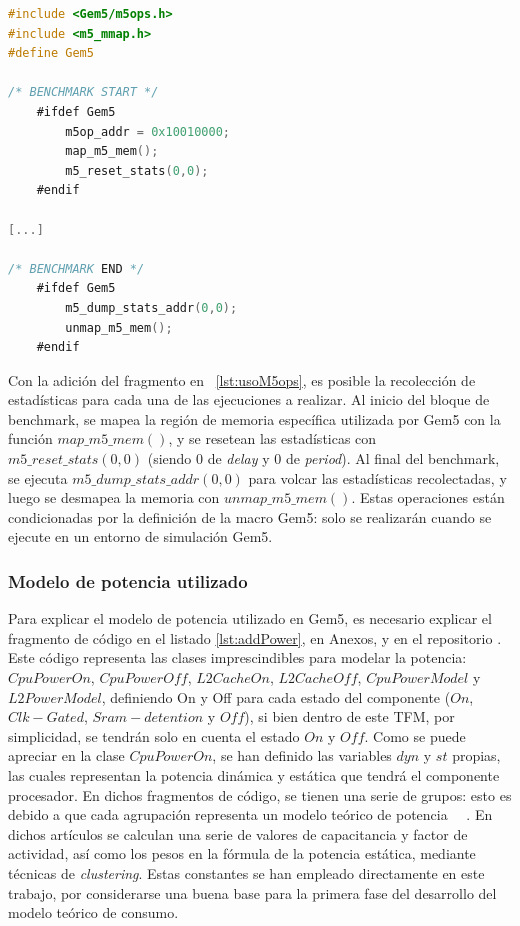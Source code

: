 \begin{lstlisting}[language=C,showstringspaces=false,frame=single,caption={Fragmento añadido},label=lst:usoM5ops]
#include <Gem5/m5ops.h>
#include <m5_mmap.h>
#define Gem5

/* BENCHMARK START */
    #ifdef Gem5
        m5op_addr = 0x10010000;
        map_m5_mem();
		m5_reset_stats(0,0);
    #endif

[...]

/* BENCHMARK END */
    #ifdef Gem5
        m5_dump_stats_addr(0,0);
        unmap_m5_mem();
    #endif
\end{lstlisting}

Con la adición del fragmento en ~\ref{lst:usoM5ops}, es posible la recolección de estadísticas para cada una de las ejecuciones a realizar. Al inicio del bloque de benchmark, se mapea la región de memoria específica utilizada por Gem5 con la función $map\_m5\_mem()$, y se resetean las estadísticas con $m5\_reset\_stats(0,0)$ (siendo 0 de \textit{delay} y 0 de \textit{period}). Al final del benchmark, se ejecuta $m5\_dump\_stats\_addr(0,0)$ para volcar las estadísticas recolectadas, y luego se desmapea la memoria con $unmap\_m5\_mem()$. Estas operaciones están condicionadas por la definición de la macro Gem5: solo se realizarán cuando se ejecute en un entorno de simulación Gem5.

\subsubsection{Modelo de potencia utilizado}
\label{explicacionModelos}
Para explicar el modelo de potencia utilizado en Gem5, es necesario explicar el fragmento de código en el listado \ref{lst:addPower}, en Anexos, y en el repositorio \cite{repoTFM-starterfs}. Este código representa las clases imprescindibles para modelar la potencia: $CpuPowerOn$, $CpuPowerOff$, $L2CacheOn$, $L2CacheOff$, $CpuPowerModel$ y $L2PowerModel$, definiendo On y Off para cada estado del componente ($On$, $Clk-Gated$, $Sram-detention$ y $Off$), si bien dentro de este \ac{TFM}, por simplicidad, se tendrán solo en cuenta el estado $On$ y $Off$. Como se puede apreciar en la clase $CpuPowerOn$, se han definido las variables $dyn$ y $st$ propias, las cuales representan la potencia dinámica y estática que tendrá el componente procesador. En dichos fragmentos de código, se tienen una serie de grupos: esto es debido a que cada agrupación representa un modelo teórico de potencia ~\cite{soton418538}~\cite{soton393728}. En dichos artículos se calculan una serie de valores de capacitancia y factor de actividad, así como los pesos en la fórmula de la potencia estática, mediante técnicas de \textit{clustering}. Estas constantes se han empleado directamente en este trabajo, por considerarse una buena base para la primera fase del desarrollo del modelo teórico de consumo. 

